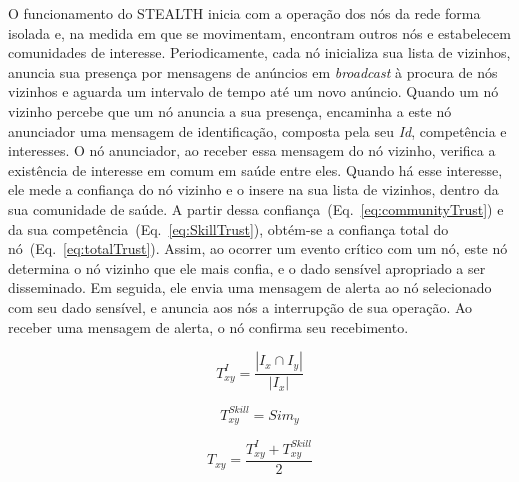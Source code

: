 \documentclass[12pt]{article}
\newcommand{\agn}[1]{\textcolor{auburn}{#1}}
\begin{document}
O funcionamento do \mbox{STEALTH} inicia com
\agn{a operação dos}
nós da rede
forma isolada e, na medida em que se movimentam, encontram outros nós e estabelecem comunidades de interesse. Periodicamente, cada nó inicializa sua lista de vizinhos, anuncia sua presença por mensagens de anúncios em \textit{broadcast} à procura de nós vizinhos e aguarda um intervalo de tempo até um novo anúncio.  Quando um nó vizinho percebe que um nó anuncia a sua presença, encaminha a este nó anunciador uma mensagem de identificação, composta pela seu \textit{Id}, competência e interesses. O nó anunciador, ao receber essa mensagem do nó vizinho, verifica a existência de interesse em comum em saúde entre eles. Quando há esse interesse, ele mede a confiança do nó vizinho e o insere na sua lista de vizinhos, dentro da sua comunidade de saúde. A partir dessa confiança~(Eq.~\ref{eq:communityTrust}) e da sua competência~(Eq.~\ref{eq:SkillTrust}), obtém-se a confiança total do nó~(Eq.~\ref{eq:totalTrust}). 
Assim, ao ocorrer um evento crítico com um nó, este nó determina o nó vizinho que ele mais confia, e o dado sensível apropriado a ser disseminado. Em seguida, ele envia uma mensagem de alerta ao nó selecionado com seu dado sensível, e anuncia aos nós a interrupção de sua operação. Ao receber uma mensagem de alerta, o nó confirma seu recebimento.


\vspace{-0.5cm}

\noindent
\begin{minipage}{.3\linewidth}
\centering
\begin{equation}
T_{xy}^{I} = \frac {|I_x \cap I_y|}{|I_x|}
\label{eq:communityTrust}
\end{equation}
\end{minipage}
\begin{minipage}{.3\linewidth}
\centering
\begin{equation}
T_{xy}^{Skill} = Sim_y
\label{eq:SkillTrust}
\end{equation}
\end{minipage}
\hspace{0.5cm}
\begin{minipage}{.3\linewidth}
\centering
\begin{equation}
T_{xy} = \frac{T_{xy}^{I} + T_{xy}^{Skill}}{2}
\label{eq:totalTrust}
\end{equation}
\end{minipage}
\end{document}
